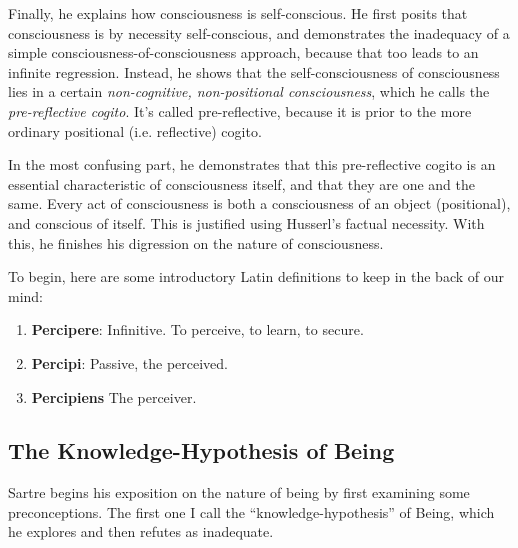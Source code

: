 Finally, he explains how consciousness is self-conscious. He first posits that consciousness is by necessity self-conscious, and demonstrates the inadequacy of a simple consciousness-of-consciousness approach, because that too leads to an infinite regression. Instead, he shows that the self-consciousness of consciousness lies in a certain \emph{non-cognitive, non-positional consciousness}, which he calls the \emph{pre-reflective cogito}. It's called pre-reflective, because it is prior to the more ordinary positional (i.e. reflective) cogito.

In the most confusing part, he demonstrates that this pre-reflective cogito is an essential characteristic of consciousness itself, and that they are one and the same.
Every act of consciousness is both a consciousness of an object (positional), and conscious of itself. This is justified using Husserl's factual necessity. With this, he finishes his digression on the nature of consciousness.

To begin, here are some introductory Latin definitions to keep in the back of our mind:

\begin{enumerate}
  \item \textbf{Percipere}: Infinitive. To perceive, to learn, to secure.
  \item \textbf{Percipi}: Passive, the perceived.
  \item \textbf{Percipiens} The perceiver.
\end{enumerate}

\subsection{The Knowledge-Hypothesis of Being}
Sartre begins his exposition on the nature of being by first examining some preconceptions. The first one I call the \enquote{knowledge-hypothesis} of Being, which he explores and then refutes as inadequate.

